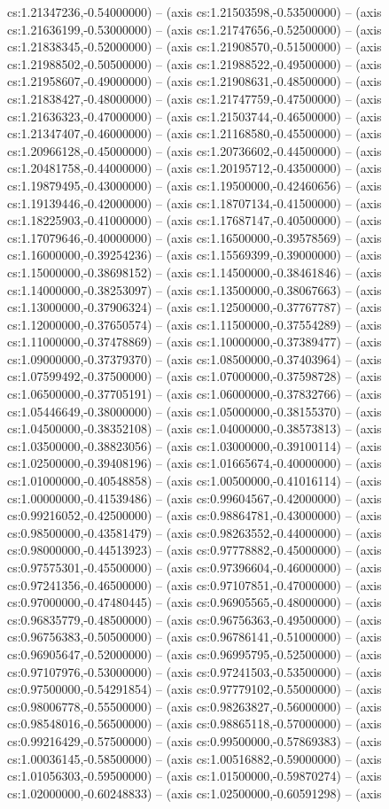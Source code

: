cs:1.21347236,-0.54000000) -- (axis cs:1.21503598,-0.53500000) -- (axis cs:1.21636199,-0.53000000) -- (axis cs:1.21747656,-0.52500000) -- (axis cs:1.21838345,-0.52000000) -- (axis cs:1.21908570,-0.51500000) -- (axis cs:1.21988502,-0.50500000) -- (axis cs:1.21988522,-0.49500000) -- (axis cs:1.21958607,-0.49000000) -- (axis cs:1.21908631,-0.48500000) -- (axis cs:1.21838427,-0.48000000) -- (axis cs:1.21747759,-0.47500000) -- (axis cs:1.21636323,-0.47000000) -- (axis cs:1.21503744,-0.46500000) -- (axis cs:1.21347407,-0.46000000) -- (axis cs:1.21168580,-0.45500000) -- (axis cs:1.20966128,-0.45000000) -- (axis cs:1.20736602,-0.44500000) -- (axis cs:1.20481758,-0.44000000) -- (axis cs:1.20195712,-0.43500000) -- (axis cs:1.19879495,-0.43000000) -- (axis cs:1.19500000,-0.42460656) -- (axis cs:1.19139446,-0.42000000) -- (axis cs:1.18707134,-0.41500000) -- (axis cs:1.18225903,-0.41000000) -- (axis cs:1.17687147,-0.40500000) -- (axis cs:1.17079646,-0.40000000) -- (axis cs:1.16500000,-0.39578569) -- (axis cs:1.16000000,-0.39254236) -- (axis cs:1.15569399,-0.39000000) -- (axis cs:1.15000000,-0.38698152) -- (axis cs:1.14500000,-0.38461846) -- (axis cs:1.14000000,-0.38253097) -- (axis cs:1.13500000,-0.38067663) -- (axis cs:1.13000000,-0.37906324) -- (axis cs:1.12500000,-0.37767787) -- (axis cs:1.12000000,-0.37650574) -- (axis cs:1.11500000,-0.37554289) -- (axis cs:1.11000000,-0.37478869) -- (axis cs:1.10000000,-0.37389477) -- (axis cs:1.09000000,-0.37379370) -- (axis cs:1.08500000,-0.37403964) -- (axis cs:1.07599492,-0.37500000) -- (axis cs:1.07000000,-0.37598728) -- (axis cs:1.06500000,-0.37705191) -- (axis cs:1.06000000,-0.37832766) -- (axis cs:1.05446649,-0.38000000) -- (axis cs:1.05000000,-0.38155370) -- (axis cs:1.04500000,-0.38352108) -- (axis cs:1.04000000,-0.38573813) -- (axis cs:1.03500000,-0.38823056) -- (axis cs:1.03000000,-0.39100114) -- (axis cs:1.02500000,-0.39408196) -- (axis cs:1.01665674,-0.40000000) -- (axis cs:1.01000000,-0.40548858) -- (axis cs:1.00500000,-0.41016114) -- (axis cs:1.00000000,-0.41539486) -- (axis cs:0.99604567,-0.42000000) -- (axis cs:0.99216052,-0.42500000) -- (axis cs:0.98864781,-0.43000000) -- (axis cs:0.98500000,-0.43581479) -- (axis cs:0.98263552,-0.44000000) -- (axis cs:0.98000000,-0.44513923) -- (axis cs:0.97778882,-0.45000000) -- (axis cs:0.97575301,-0.45500000) -- (axis cs:0.97396604,-0.46000000) -- (axis cs:0.97241356,-0.46500000) -- (axis cs:0.97107851,-0.47000000) -- (axis cs:0.97000000,-0.47480445) -- (axis cs:0.96905565,-0.48000000) -- (axis cs:0.96835779,-0.48500000) -- (axis cs:0.96756363,-0.49500000) -- (axis cs:0.96756383,-0.50500000) -- (axis cs:0.96786141,-0.51000000) -- (axis cs:0.96905647,-0.52000000) -- (axis cs:0.96995795,-0.52500000) -- (axis cs:0.97107976,-0.53000000) -- (axis cs:0.97241503,-0.53500000) -- (axis cs:0.97500000,-0.54291854) -- (axis cs:0.97779102,-0.55000000) -- (axis cs:0.98006778,-0.55500000) -- (axis cs:0.98263827,-0.56000000) -- (axis cs:0.98548016,-0.56500000) -- (axis cs:0.98865118,-0.57000000) -- (axis cs:0.99216429,-0.57500000) -- (axis cs:0.99500000,-0.57869383) -- (axis cs:1.00036145,-0.58500000) -- (axis cs:1.00516882,-0.59000000) -- (axis cs:1.01056303,-0.59500000) -- (axis cs:1.01500000,-0.59870274) -- (axis cs:1.02000000,-0.60248833) -- (axis cs:1.02500000,-0.60591298) -- (axis 